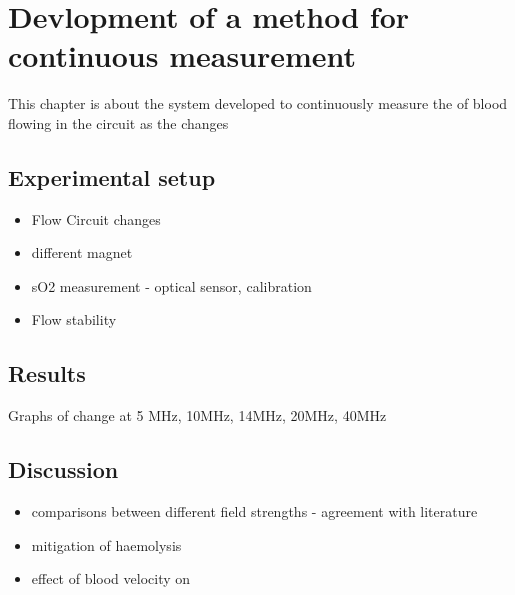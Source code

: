 \chapter{Devlopment of a method for continuous \SOtwo measurement}
\label{ch:contsetup}

This chapter is about the system developed to continuously measure the \Ttwo of blood flowing in the circuit as the \SOtwo changes
\section{Experimental setup}

\begin{itemize}
\item Flow Circuit changes
\item different magnet
\item sO2 measurement - optical sensor, calibration
\item Flow stability
\end{itemize}


\section{Results}

Graphs of \Ttwo change at 5 MHz, 10MHz, 14MHz, 20MHz, 40MHz

\section{Discussion}
\begin{itemize}
\item comparisons between different field strengths - agreement with literature
\item mitigation of haemolysis
\item effect of blood velocity on \Ttwo

\end{itemize}
